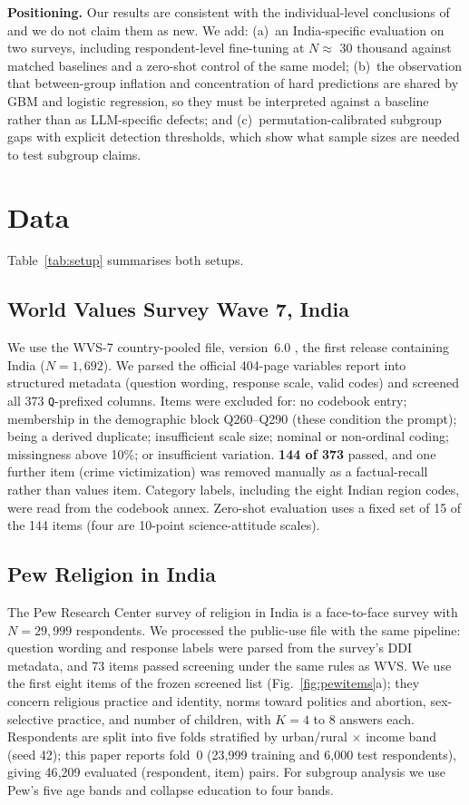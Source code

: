 \documentclass[conference]{IEEEtran}
\begin{document}
\textbf{Positioning.} Our results are consistent with the individual-level conclusions of~\cite{chen2026,miranda2025} and we do not claim them as new. We add: (a)~an India-specific evaluation on two surveys, including respondent-level fine-tuning at $N\approx$ 30 thousand against matched baselines and a zero-shot control of the same model; (b)~the observation that between-group inflation and concentration of hard predictions are shared by GBM and logistic regression, so they must be interpreted against a baseline rather than as LLM-specific defects; and (c)~permutation-calibrated subgroup gaps with explicit detection thresholds, which show what sample sizes are needed to test subgroup claims.

\section{Data}

Table~\ref{tab:setup} summarises both setups.

\subsection{World Values Survey Wave 7, India}

We use the WVS-7 country-pooled file, version~6.0 \cite{wvs7}, the first release containing India ($N=1{,}692$). We parsed the official 404-page variables report into structured metadata (question wording, response scale, valid codes) and screened all 373 \texttt{Q}-prefixed columns. Items were excluded for: no codebook entry; membership in the demographic block Q260--Q290 (these condition the prompt); being a derived duplicate; insufficient scale size; nominal or non-ordinal coding; missingness above 10\%; or insufficient variation. \textbf{144 of 373} passed, and one further item (crime victimization) was removed manually as a factual-recall rather than values item. Category labels, including the eight Indian region codes, were read from the codebook annex. Zero-shot evaluation uses a fixed set of 15 of the 144 items (four are 10-point science-attitude scales).

\subsection{Pew Religion in India}

The Pew Research Center survey of religion in India \cite{pew2021} is a face-to-face survey with $N=29{,}999$ respondents. We processed the public-use file with the same pipeline: question wording and response labels were parsed from the survey's DDI metadata, and 73 items passed screening under the same rules as WVS. We use the first eight items of the frozen screened list (Fig.~\ref{fig:pewitems}a); they concern religious practice and identity, norms toward politics and abortion, sex-selective practice, and number of children, with $K=4$ to 8 answers each. Respondents are split into five folds stratified by urban/rural $\times$ income band (seed 42); this paper reports fold~0 (23{,}999 training and 6{,}000 test respondents), giving 46{,}209 evaluated (respondent, item) pairs. For subgroup analysis we use Pew's five age bands and collapse education to four bands.
\end{document}
